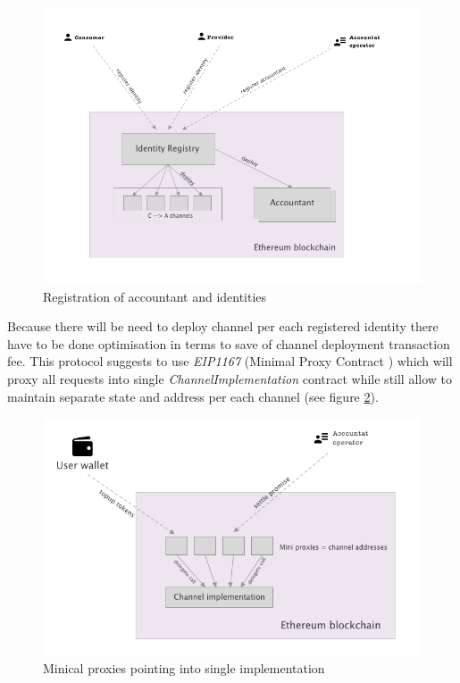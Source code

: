 \documentclass[a4paper,12pt]{article}
\begin{document}
\begin{figure}[H]
    \centering
    \includegraphics[scale=0.4]{img/registration}
    \caption{Registration of accountant and identities}
    \label{img:registration}
\end{figure}

Because there will be need to deploy channel per each registered identity there 
have to be done optimisation in terms to save of channel deployment transaction 
fee. This protocol suggests to use \textit{EIP1167} (Minimal Proxy Contract 
\cite{eip1167}) which will proxy all requests into single 
\textit{ChannelImplementation} contract while still allow to maintain separate 
state and address per each channel (see figure \ref{img:proxy}).

\begin{figure}[H]
    \centering
    \includegraphics[scale=0.5]{img/proxy}
    \caption{Minical proxies pointing into single implementation}
    \label{img:proxy}
\end{figure}
\end{document}
